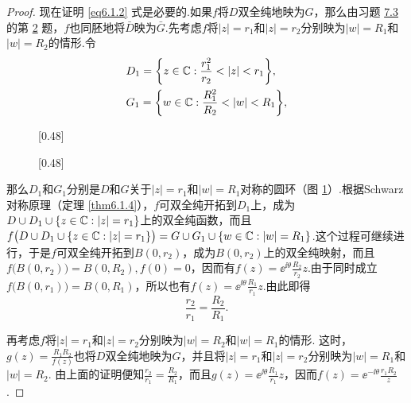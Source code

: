 \begin{proof}
  现在证明 \eqref{eq6.1.2} 式是必要的.如果$f$将$D$双全纯地映为$G$，那么由习题 \hyperlink{xiti7.3}{7.3} 的第  \hyperlink{xiti7.3.2}{2} 题，$f$也同胚地将$\bar D$映为$\bar G$.先考虑$f$将$|z|=r_1$和$|z|=r_2$分别映为$|w|=R_1$和$|w|=R_2$的情形.令
  \begin{align*}
    & D_1 = \bigg\{z\in\MC:\frac{r_1^2}{r_2}<|z|<r_1\bigg\},\\
    & G_1 = \bigg\{w\in\MC:\frac{R_1^2}{R_2}<|w|<R_1\bigg\},
  \end{align*}
  \begin{figure}[!ht]
    \centering
    \subcaptionbox{\label{fig6.3a}}[0.48\textwidth]
      {
      }
    \subcaptionbox{\label{fig6.3b}}[0.48\textwidth]
      {
      }
      \caption{\label{fig6.3}}
  \end{figure}
  那么$D_1$和$G_1$分别是$D$和$G$关于$|z|=r_1$和$|w|=R_1$对称的圆环（图 \ref{fig6.3}）.根据Schwarz对称原理（定理 \ref{thm6.1.4}），$f$可双全纯开拓到$D_1$上，成为$D\cup D_1\cup\{z\in\mathbb C:|z|=r_1\}$上的双全纯函数，而且$f\big(D\cup D_1\cup\{z\in\mathbb C:|z|=r_1\}\big)=G\cup G_1\cup\{w\in\mathbb C:|w|=R_1\}$.这个过程可继续进行，于是$f$可双全纯开拓到$B(0,r_2)$，成为$B(0,r_2)$上的双全纯映射，而且$f\big(B(0,r_2)\big)
  =B(0,R_2),f(0)=0$，因而有$f(z)=\ee^{\ii\theta}\frac{R_2}{r_2}z$.由于同时成立$f\big(B(0,r_1)\big)=B(0,R_1)$，所以也有$f(z)=\ee^{\ii\theta}\frac{R_1}{r_1}z$.由此即得
  \[
    \frac{r_2}{r_1} = \frac{R_2}{R_1}.
  \]

  再考虑$f$将$|z|=r_1$和$|z|=r_2$分别映为$|w|=R_2$和$|w|=R_1$的情形. 这时，$g(z)=\frac{R_1R_2}{f(z)}$也将$D$双全纯地映为$G$，并且将$|z|=r_1$和$|z|=r_2$分别映为$|w|=R_1$和$|w|=R_2$. 由上面的证明便知$\frac{r_2}{r_1}=\frac{R_2}{R_1}$，而且$g(z)=\ee^{\ii\theta}\frac{R_1}{r_1}z$，因而$f(z)=\ee^{-\ii\theta}\frac{r_1R_2}{z}$.
\end{proof}
